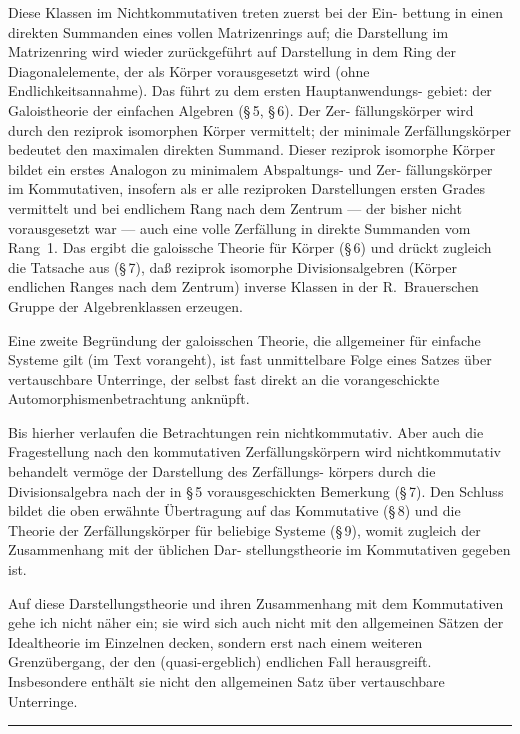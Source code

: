 \documentclass[12pt,a4paper]{article}
\theoremstyle{plain}
\begin{document}
Diese Klassen im Nichtkommutativen treten zuerst bei der Ein-
bettung in einen direkten Summanden eines vollen Matrizenrings auf; die
Darstellung im Matrizenring wird wieder zur\"uckgef\"uhrt auf Darstellung
in dem Ring der Diagonalelemente, der als K\"orper vorausgesetzt wird
(ohne Endlichkeitsannahme). Das f\"uhrt zu dem ersten Hauptanwendungs-
gebiet: der Galoistheorie der einfachen Algebren (\S\,5, \S\,6). Der Zer-
f\"allungsk\"orper wird durch den reziprok isomorphen K\"orper vermittelt; der
minimale Zerf\"allungsk\"orper bedeutet den maximalen direkten Summand.
Dieser reziprok isomorphe K\"orper bildet ein erstes Analogon zu minimalem Abspaltungs- und Zer-
f\"allungsk\"orper im Kommutativen, insofern als er alle reziproken Darstellungen
ersten Grades vermittelt und bei endlichem Rang nach dem Zentrum ---
der bisher nicht vorausgesetzt war --- auch eine volle Zerf\"allung in direkte
Summanden vom Rang~1. Das ergibt die galoissche Theorie f\"ur K\"orper
(\S\,6) und dr\"uckt zugleich die Tatsache aus (\S\,7), da\ss{} reziprok isomorphe
Divisionsalgebren (K\"orper endlichen Ranges nach dem Zentrum) inverse
Klassen in der R.~Brauerschen Gruppe der Algebrenklassen erzeugen.

Eine zweite Begr\"undung der galoisschen Theorie, die allgemeiner f\"ur einfache
Systeme gilt (im Text vorangeht), ist fast unmittelbare Folge eines Satzes
\"uber vertauschbare Unterringe, der selbst fast direkt an die vorangeschickte
Automorphismenbetrachtung ankn\"upft.

Bis hierher verlaufen die Betrachtungen rein nichtkommutativ. Aber
auch die Fragestellung nach den kommutativen Zerf\"allungsk\"orpern wird
nichtkommutativ behandelt verm\"oge der Darstellung des Zerf\"allungs-
k\"orpers durch die Divisionsalgebra nach der in \S\,5 vorausgeschickten
Bemerkung (\S\,7). Den Schluss bildet die oben erw\"ahnte \"Ubertragung auf
das Kommutative (\S\,8) und die Theorie der Zerf\"allungsk\"orper f\"ur beliebige
Systeme (\S\,9), womit zugleich der Zusammenhang mit der \"ublichen Dar-
stellungstheorie im Kommutativen gegeben ist.

Auf diese Darstellungstheorie und ihren Zusammenhang mit dem
Kommutativen gehe ich nicht n\"aher ein; sie wird sich auch nicht mit den
allgemeinen S\"atzen der Idealtheorie im Einzelnen decken, sondern erst nach
einem weiteren Grenz\"ubergang, der den (quasi-ergeblich) endlichen Fall
herausgreift. Insbesondere enth\"alt sie nicht den allgemeinen Satz \"uber
vertauschbare Unterringe.

\bigskip
\noindent\rule{0.3\textwidth}{0.4pt}
\end{document}
